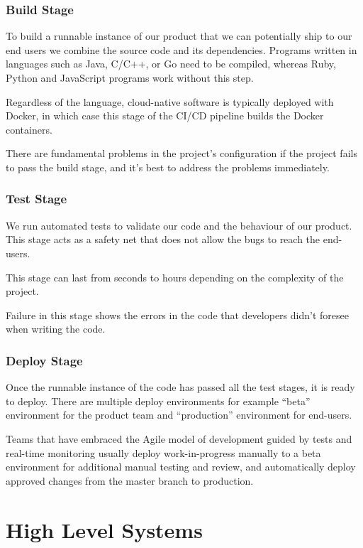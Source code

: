 \subsubsection{Build Stage}
To build a runnable instance of our product that we can potentially ship to our end users we combine 
the source code and its dependencies. Programs written in languages such as Java, C/C++, or Go need 
to be compiled, whereas Ruby, Python and JavaScript programs work without this step.

Regardless of the language, cloud-native software is typically deployed with Docker, in which case this 
stage of the CI/CD pipeline builds the Docker containers.

There are fundamental problems in the project's configuration if the project fails to pass the build 
stage, and it’s best to address the problems immediately.

\subsubsection{Test Stage}
We run automated tests to validate our code and the behaviour of our product. This stage acts as a safety
net that does not allow the bugs to reach the end-users.

This stage can last from seconds to hours depending on the complexity of the project.

Failure in this stage shows the errors in the code that developers didn't foresee when writing the code.

\subsubsection{Deploy Stage}
Once the runnable instance of the code has passed all the test stages, it is ready to deploy. There are 
multiple deploy environments for example “beta” environment for the product team and “production” 
environment for end-users.

Teams that have embraced the Agile model of development guided by tests and real-time monitoring usually 
deploy work-in-progress manually to a beta environment for additional manual testing and review, and 
automatically deploy approved changes from the master branch to production.

\section{High Level Systems}

